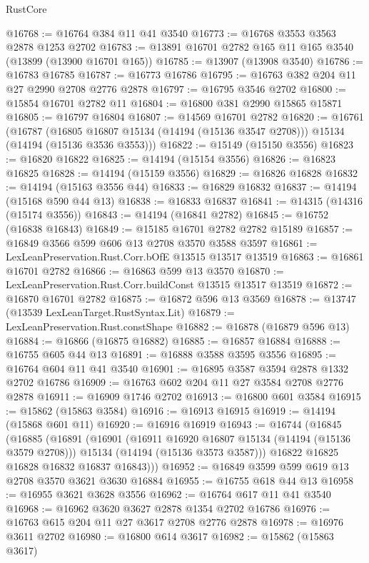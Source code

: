 \begin{lexlean}{RustCore}
\begin{coremodule}
@16768 := @16764 @384 @11 @41 @3540
@16773 := @16768 @3553 @3563 @2878 @1253 @2702
@16783 := @13891 @16701 @2782 @165 @11 @165 @3540 (@13899 (@13900 @16701 @165))
@16785 := @13907 (@13908 @3540)
@16786 := @16783 @16785
@16787 := @16773 @16786
@16795 := @16763 @382 @204 @11 @27 @2990 @2708 @2776 @2878
@16797 := @16795 @3546 @2702
@16800 := @15854 @16701 @2782 @11
@16804 := @16800 @381 @2990 @15865 @15871
@16805 := @16797 @16804
@16807 := @14569 @16701 @2782
@16820 := @16761
    (@16787
      (@16805 @16807 @15134 (@14194 (@15136 @3547 @2708)))
      @15134
      (@14194 (@15136 @3536 @3553)))
@16822 := @15149 (@15150 @3556)
@16823 := @16820 @16822
@16825 := @14194 (@15154 @3556)
@16826 := @16823 @16825
@16828 := @14194 (@15159 @3556)
@16829 := @16826 @16828
@16832 := @14194 (@15163 @3556 @44)
@16833 := @16829 @16832
@16837 := @14194 (@15168 @590 @44 @13)
@16838 := @16833 @16837
@16841 := @14315 (@14316 (@15174 @3556))
@16843 := @14194 (@16841 @2782)
@16845 := @16752 (@16838 @16843)
@16849 := @15185 @16701 @2782 @2782 @15189
@16857 := @16849 @3566 @599 @606 @13 @2708 @3570 @3588 @3597
@16861 := LexLeanPreservation.Rust.Corr.bOfE @13515 @13517 @13519
@16863 := @16861 @16701 @2782
@16866 := @16863 @599 @13 @3570
@16870 := LexLeanPreservation.Rust.Corr.buildConst @13515 @13517 @13519
@16872 := @16870 @16701 @2782
@16875 := @16872 @596 @13 @3569
@16878 := @13747 (@13539 LexLeanTarget.RustSyntax.Lit)
@16879 := LexLeanPreservation.Rust.constShape
@16882 := @16878 (@16879 @596 @13)
@16884 := @16866 (@16875 @16882)
@16885 := @16857 @16884
@16888 := @16755 @605 @44 @13
@16891 := @16888 @3588 @3595 @3556
@16895 := @16764 @604 @11 @41 @3540
@16901 := @16895 @3587 @3594 @2878 @1332 @2702 @16786
@16909 := @16763 @602 @204 @11 @27 @3584 @2708 @2776 @2878
@16911 := @16909 @1746 @2702
@16913 := @16800 @601 @3584
@16915 := @15862 (@15863 @3584)
@16916 := @16913 @16915
@16919 := @14194 (@15868 @601 @11)
@16920 := @16916 @16919
@16943 := @16744
    (@16845
      (@16885
        (@16891
          (@16901
            (@16911 @16920 @16807 @15134 (@14194 (@15136 @3579 @2708)))
            @15134
            (@14194 (@15136 @3573 @3587)))
          @16822
          @16825
          @16828
          @16832
          @16837
          @16843)))
@16952 := @16849 @3599 @599 @619 @13 @2708 @3570 @3621 @3630 @16884
@16955 := @16755 @618 @44 @13
@16958 := @16955 @3621 @3628 @3556
@16962 := @16764 @617 @11 @41 @3540
@16968 := @16962 @3620 @3627 @2878 @1354 @2702 @16786
@16976 := @16763 @615 @204 @11 @27 @3617 @2708 @2776 @2878
@16978 := @16976 @3611 @2702
@16980 := @16800 @614 @3617
@16982 := @15862 (@15863 @3617)

\end{coremodule}
\end{lexlean}

